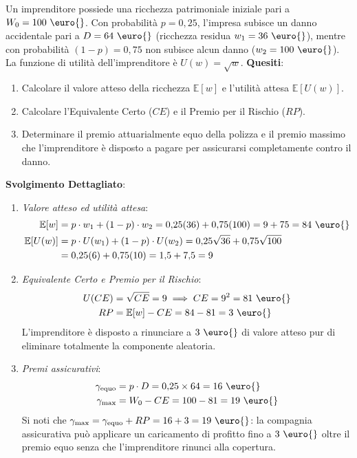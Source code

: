 \begin{esercizio}
Un imprenditore possiede una ricchezza patrimoniale iniziale pari a $W_0 = 100\text{ \euro{}}$. Con probabilità $p = 0{,}25$, l'impresa subisce un danno accidentale pari a $D = 64\text{ \euro{}}$ (ricchezza residua $w_1 = 36\text{ \euro{}}$), mentre con probabilità $(1 - p) = 0{,}75$ non subisce alcun danno ($w_2 = 100\text{ \euro{}}$). La funzione di utilità dell'imprenditore è $U(w) = \sqrt{w}$.
\textbf{Quesiti}:
\begin{enumerate}
    \item Calcolare il valore atteso della ricchezza $\mathbb{E}[w]$ e l'utilità attesa $\mathbb{E}[U(w)]$.
    \item Calcolare l'Equivalente Certo ($CE$) e il Premio per il Rischio ($RP$).
    \item Determinare il premio attuarialmente equo della polizza e il premio massimo che l'imprenditore è disposto a pagare per assicurarsi completamente contro il danno.
\end{enumerate}

\tcbline
\textbf{Svolgimento Dettagliato}:
\begin{enumerate}
    \item \textit{Valore atteso ed utilità attesa}:
    \begin{align*}
        \mathbb{E}[w] &= p \cdot w_1 + (1 - p) \cdot w_2 = 0{,}25(36) + 0{,}75(100) = 9 + 75 = 84\text{ \euro{}} \\
        \mathbb{E}[U(w)] &= p \cdot U(w_1) + (1 - p) \cdot U(w_2) = 0{,}25\sqrt{36} + 0{,}75\sqrt{100} \\
        &= 0{,}25(6) + 0{,}75(10) = 1{,}5 + 7{,}5 = 9
    \end{align*}
    
    \item \textit{Equivalente Certo e Premio per il Rischio}:
    \begin{align*}
        U(CE) &= \sqrt{CE} = 9 \implies CE = 9^2 = 81\text{ \euro{}} \\
        RP &= \mathbb{E}[w] - CE = 84 - 81 = 3\text{ \euro{}}
    \end{align*}
    L'imprenditore è disposto a rinunciare a $3\text{ \euro{}}$ di valore atteso pur di eliminare totalmente la componente aleatoria.
    
    \item \textit{Premi assicurativi}:
    \begin{align*}
        \gamma_{\text{equo}} &= p \cdot D = 0{,}25 \times 64 = 16\text{ \euro{}} \\
        \gamma_{\max} &= W_0 - CE = 100 - 81 = 19\text{ \euro{}}
    \end{align*}
    Si noti che $\gamma_{\max} = \gamma_{\text{equo}} + RP = 16 + 3 = 19\text{ \euro{}}$: la compagnia assicurativa può applicare un caricamento di profitto fino a $3\text{ \euro{}}$ oltre il premio equo senza che l'imprenditore rinunci alla copertura.
\end{enumerate}
\end{esercizio}
